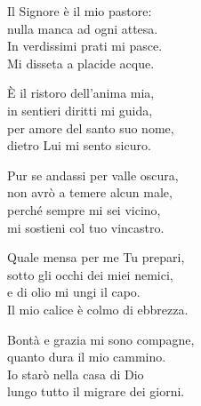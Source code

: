 
\strofa Il Signore è il mio pastore:\\
nulla manca ad ogni attesa.\\
In verdissimi prati mi pasce.\\
Mi disseta a placide acque.

\spazio

\strofa È il ristoro dell'anima mia,\\
in sentieri diritti mi guida,\\
per amore del santo suo nome,\\
dietro Lui mi sento sicuro.

\spazio

\strofa Pur se andassi per valle oscura,\\
non avrò a temere alcun male,\\
perché sempre mi sei vicino,\\
mi sostieni col tuo vincastro.

\spazio

\strofa Quale mensa per me Tu prepari,\\
sotto gli occhi dei miei nemici,\\
e di olio mi ungi il capo.\\
Il mio calice è colmo di ebbrezza.

\spazio

\strofa Bontà e grazia mi sono compagne,\\
quanto dura il mio cammino.\\
Io starò nella casa di Dio\\
lungo tutto il migrare dei giorni.